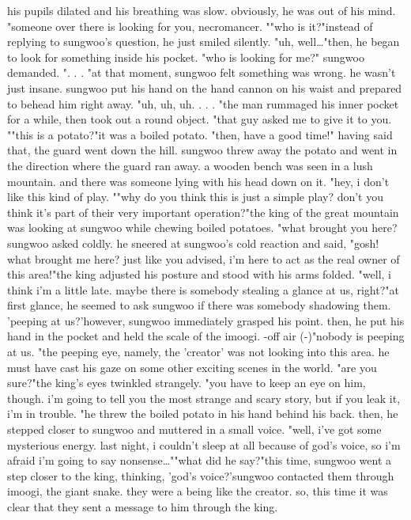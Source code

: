  his pupils dilated and his breathing was slow.
 obviously, he was out of his mind.
"someone over there is looking for you, necromancer.
""who is it?"instead of replying to sungwoo's question, he just smiled silently.
"uh, well…"then, he began to look for something inside his pocket.
"who is looking for me?" sungwoo demanded.
".
.
.
"at that moment, sungwoo felt something was wrong.
 he wasn't just insane.
sungwoo put his hand on the hand cannon on his waist and prepared to behead him right away.
"uh, uh, uh.
.
.
.
"the man rummaged his inner pocket for a while, then took out a round object.
"that guy asked me to give it to you.
""this is a potato?"it was a boiled potato.
"then, have a good time!"
having said that, the guard went down the hill.
sungwoo threw away the potato and went in the direction where the guard ran away.
a wooden bench was seen in a lush mountain.
 and there was someone lying with his head down on it.
"hey, i don't like this kind of play.
""why do you think this is just a simple play? don't you think it's part of their very important operation?"the king of the great mountain was looking at sungwoo while chewing boiled potatoes.
"what brought you here? sungwoo asked coldly.
he sneered at sungwoo's cold reaction and said, "gosh! what brought me here? just like you advised, i'm here to act as the real owner of this area!"the king adjusted his posture and stood with his arms folded.
"well, i think i'm a little late.
 maybe there is somebody stealing a glance at us, right?"at first glance, he seemed to ask sungwoo if there was somebody shadowing them.
'peeping at us?'however, sungwoo immediately grasped his point.
 then, he put his hand in the pocket and held the scale of the imoogi.
-off air (-)"nobody is peeping at us.
"the peeping eye, namely, the 'creator' was not looking into this area.
 he must have cast his gaze on some other exciting scenes in the world.
"are you sure?"the king's eyes twinkled strangely.
"you have to keep an eye on him, though.
 i'm going to tell you the most strange and scary story, but if you leak it, i'm in trouble.
"he threw the boiled potato in his hand behind his back.
 then, he stepped closer to sungwoo and muttered in a small voice.
"well, i've got some mysterious energy.
 last night, i couldn't sleep at all because of god's voice, so i'm afraid i'm going to say nonsense…""what did he say?"this time, sungwoo went a step closer to the king, thinking, 'god's voice?'sungwoo contacted them through imoogi, the giant snake.
 they were a being like the creator.
 so, this time it was clear that they sent a message to him through the king.
